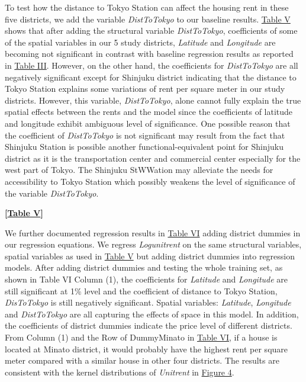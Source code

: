 \documentclass[a4paper, 12pt]{article} %
\newcommand{\var}[1][\textit]{#1}
\begin{document}
To test how the distance to Tokyo Station can affect the housing rent in these five districts, we add the variable \var{DistToTokyo} to our baseline results. \hyperref[tb5]{Table V} shows that after adding the structural variable \var{DistToTokyo}, coefficients of some of the spatial variables in our 5 study districts, \var{Latitude} and \var{Longitude} are becoming not significant in contrast with baseline regression results as reported in \hyperref[tb3]{Table III}. However, on the other hand, the coefficients for \var{DistToTokyo} are all negatively significant except for Shinjuku district indicating that the distance to Tokyo Station explains some variations of rent per square meter in our study districts. However, this variable, \var{DistToTokyo}, alone cannot fully explain the true spatial effects between the rents and the model since the coefficients of latitude and longitude exhibit ambiguous level of significance. One possible reason that the coefficient of \var{DistToTokyo} is not significant may result from the fact that Shinjuku Station is possible another functional-equivalent point for Shinjuku district as it is the transportation center and commercial center especially for the west part of Tokyo. The Shinjuku StWWation may alleviate the needs for accessibility to Tokyo Station which possibly weakens the level of significance of the variable \var{DistToTokyo}.

\bigskip
 \centerline{\bf [\hyperref[tb5]{Table V}]}
\bigskip

We further documented regression results in \hyperref[tb6]{Table VI} adding district dummies in our regression equations. We regress \var{Logunitrent} on the same structural variables, spatial variables as used in \hyperref[tb5]{Table V} but adding district dummies into regression models. After adding district dummies and testing the whole training set, as shown in Table VI Column (1), the coefficients for \var{Latitude} and \var{Longitude} are still significant at 1\% level and the coefficient of distance to Tokyo Station, \var{DisToTokyo} is still negatively significant. Spatial variables: \var{Latitude}, \var{Longitude} and \var{DistToTokyo} are all capturing the effects of space in this model. In addition, the coefficients of district dummies indicate the price level of different districts. From Column (1) and the Row of DummyMinato in \hyperref[tb6]{Table VI}, if a house is located at Minato district, it would probably have the highest rent per square meter compared with a similar house in other four districts. The results are consistent with the kernel distributions of \var{Unitrent} in \hyperref[fig4]{Figure 4}.
\end{document}
